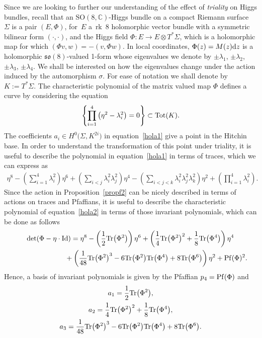 \documentclass[pdftex]{sigma}
\numberwithin{equation}{section}
\newcommand{\Id}{\operatorname{Id}}
\newcommand{\SO}{{\mathrm{SO}}}
\begin{document}
Since we are looking to further our understanding of the effect of {\it triality} on Higgs bundles, recall that an $\SO(8,\mathbb{C})$-Higgs bundle on a compact Riemann surface~$\Sigma$ is a pair $(E,\Phi)$, for~$E$ a~rk~8 holomorphic vector bundle with a symmetric bilinear form $(\cdot,\cdot)$, and the Higgs field $\Phi\colon E\rightarrow E\otimes T^*\Sigma$, which is a holomorphic map for which $(\Phi v,w)=-(v,\Phi w)$. In local coordinates, $\Phi (z) = M(z) {\rm d}z$ is a holomorphic $\mathfrak{so}(8)$-valued 1-form whose eigenvalues we denote by $\pm \lambda_1$, $\pm \lambda_2$, $\pm \lambda_3$, $\pm \lambda_4$. We shall be interested on how the eigenvalues change under the action induced by the automorphism $\sigma$. For ease of notation we shall denote by $K:=T^*\Sigma$. The characteristic polynomial of the matrix valued map $\Phi$ defines a curve by considering the equation \begin{eqnarray}
\left\{
 \prod_{i=1}^4\big(\eta^2-\lambda_i^2\big)=0
\right\}\subset {\rm Tot}(K).\label{hola1}
\end{eqnarray}
The coefficients $a_i\in H^{0}\big(\Sigma,K^{2i}\big)$ in equation~\eqref{hola1} give a point in the Hitchin base. In order to understand the transformation of this point under triality, it is useful to describe the polynomial in equation~\eqref{hola1} in terms of traces, which we can express as
\begin{eqnarray}
 \eta^8-\left(\sum_{i=1}^4\lambda_i^2\right)\eta^6+\left(\sum_{i<j}\lambda_i^2\lambda_j^2\right)\eta^4 -\left(\sum_{i<j<k}\lambda_i^2\lambda_j^2\lambda_k^2\right)\eta^2+\left(\prod_{i=1}^4\lambda_i^2\right). \label{hola2}
\end{eqnarray}
Since the action in Proposition~\ref{propf2} can be nicely described in terms of actions on traces and Pfaffians, it is useful to describe the characteristic polynomial of equation~\eqref{hola2} in terms of those invariant polynomials, which can be done as follows
\begin{gather*}
\det(\Phi-\eta \cdot \Id)
 = \eta^8-\left(\frac{1}{2}{\rm Tr}\big(\Phi^2\big)\right)\eta^6+
\left(\frac{1}{4}{\rm Tr}\big(\Phi^2\big)^2+\frac{1}{8}{\rm Tr}\big(\Phi^4\big)
\right)\eta^4\nonumber\\
\hphantom{\det(\Phi-\eta \cdot \Id)=}{} +
\left(\frac{1}{48}{\rm Tr}\big(\Phi^2\big)^3-6{\rm Tr}\big(\Phi^2\big){\rm Tr}\big(\Phi^4\big)+8{\rm Tr}\big(\Phi^6\big)
\right)\eta^2
+{\rm Pf}(\Phi)^2. %
\end{gather*}
Hence, a basis of invariant polynomials is given by the Pfaffian $p_4={\rm Pf}(\Phi)$ and
\begin{gather*}
a_1=\frac{1}{2}{\rm Tr}\big(\Phi^2\big), \\
a_2= \frac{1}{4}{\rm Tr}\big(\Phi^2\big)^2+\frac{1}{8}{\rm Tr}\big(\Phi^4\big),
 \\
a_3= \frac{1}{48}{\rm Tr}\big(\Phi^2\big)^3-6{\rm Tr}\big(\Phi^2\big){\rm Tr}\big(\Phi^4\big)+8{\rm Tr}\big(\Phi^6\big).
\end{gather*}
\end{document}
